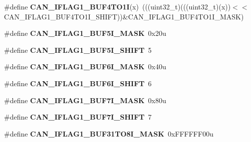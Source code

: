 \begin{DoxyCompactItemize}
\item 
\#define {\bfseries C\+A\+N\+\_\+\+I\+F\+L\+A\+G1\+\_\+\+B\+U\+F4\+T\+O1I}(x)~(((uint32\+\_\+t)(((uint32\+\_\+t)(x))$<$$<$C\+A\+N\+\_\+\+I\+F\+L\+A\+G1\+\_\+\+B\+U\+F4\+T\+O1\+I\+\_\+\+S\+H\+I\+FT))\&C\+A\+N\+\_\+\+I\+F\+L\+A\+G1\+\_\+\+B\+U\+F4\+T\+O1\+I\+\_\+\+M\+A\+SK)\hypertarget{group__CAN__Register__Masks_ga9e9f76f73c78d9858547491a2ea951b0}{}\label{group__CAN__Register__Masks_ga9e9f76f73c78d9858547491a2ea951b0}

\item 
\#define {\bfseries C\+A\+N\+\_\+\+I\+F\+L\+A\+G1\+\_\+\+B\+U\+F5\+I\+\_\+\+M\+A\+SK}~0x20u\hypertarget{group__CAN__Register__Masks_ga5ba2a22d90a915a0504e74e0be2ae46e}{}\label{group__CAN__Register__Masks_ga5ba2a22d90a915a0504e74e0be2ae46e}

\item 
\#define {\bfseries C\+A\+N\+\_\+\+I\+F\+L\+A\+G1\+\_\+\+B\+U\+F5\+I\+\_\+\+S\+H\+I\+FT}~5\hypertarget{group__CAN__Register__Masks_ga4eef45eb97993797f0e4d25d84ae98ae}{}\label{group__CAN__Register__Masks_ga4eef45eb97993797f0e4d25d84ae98ae}

\item 
\#define {\bfseries C\+A\+N\+\_\+\+I\+F\+L\+A\+G1\+\_\+\+B\+U\+F6\+I\+\_\+\+M\+A\+SK}~0x40u\hypertarget{group__CAN__Register__Masks_ga0aec3c62d96f6f8e8afd046065838df7}{}\label{group__CAN__Register__Masks_ga0aec3c62d96f6f8e8afd046065838df7}

\item 
\#define {\bfseries C\+A\+N\+\_\+\+I\+F\+L\+A\+G1\+\_\+\+B\+U\+F6\+I\+\_\+\+S\+H\+I\+FT}~6\hypertarget{group__CAN__Register__Masks_gac3a088607f853fdddfc0011293e1c336}{}\label{group__CAN__Register__Masks_gac3a088607f853fdddfc0011293e1c336}

\item 
\#define {\bfseries C\+A\+N\+\_\+\+I\+F\+L\+A\+G1\+\_\+\+B\+U\+F7\+I\+\_\+\+M\+A\+SK}~0x80u\hypertarget{group__CAN__Register__Masks_gacc148d0c9e26a80f08110dc2c5045809}{}\label{group__CAN__Register__Masks_gacc148d0c9e26a80f08110dc2c5045809}

\item 
\#define {\bfseries C\+A\+N\+\_\+\+I\+F\+L\+A\+G1\+\_\+\+B\+U\+F7\+I\+\_\+\+S\+H\+I\+FT}~7\hypertarget{group__CAN__Register__Masks_ga327609a9678df5c8c34053d43b550422}{}\label{group__CAN__Register__Masks_ga327609a9678df5c8c34053d43b550422}

\item 
\#define {\bfseries C\+A\+N\+\_\+\+I\+F\+L\+A\+G1\+\_\+\+B\+U\+F31\+T\+O8\+I\+\_\+\+M\+A\+SK}~0x\+F\+F\+F\+F\+F\+F00u\hypertarget{group__CAN__Register__Masks_ga70c705b79c7bd7451ebdee6bc0ba6f1c}{}\label{group__CAN__Register__Masks_ga70c705b79c7bd7451ebdee6bc0ba6f1c}


\end{DoxyCompactItemize}
